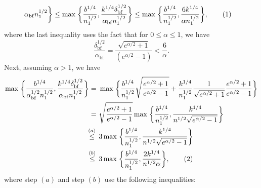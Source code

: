 \documentclass[twoside,11pt]{article}
\newcommand\numberthis{\addtocounter{equation}{1}\tag{\theequation}}
\newcommand{\normSqMultinomMax}{b}
\newcommand{\alphabetSize}{k} %
\newcommand{\sampleSize}{n}
\newcommand{\privacyParameter}{\alpha} %
\newcommand{\privacyParameterrappor}{\privacyParameter_{\mathrm{bf}}}
\newcommand{\smallNumber}{\delta}
\newcommand{\smallNumberrappor}{\smallNumber_{\mathrm{bf}}}
\begin{document}
\begin{appendix}
\begin{itemize}
\begin{align*}
{		}{
			\privacyParameterrappor
			\sampleSize_1^{1/2}}
		\biggr\}
		&\leq
		\max \;
		\biggl\{
		\frac{
			\normSqMultinomMax^{1/4}
		}{
			\sampleSize_1^{1/2}}
		,
		\frac{
			\alphabetSize^{1/4}
			\smallNumberrappor^{1/2} 
		}{
			\privacyParameterrappor
			\sampleSize_1^{1/2}}
		\biggr\}
		\leq
		\max \;
		\biggl\{
		\frac{
			\normSqMultinomMax^{1/4}
		}{
			\sampleSize_1^{1/2}}
		,
		\frac{
			6\alphabetSize^{1/4}
		}{
			\privacyParameter
			\sampleSize_1^{1/2}}
		\biggr\},
		\numberthis
		\label{rappor_final_high_privacy}
	\end{align*}
	where the last inequality uses the fact that for $0 \leq \privacyParameter \leq 1$, we have
	\begin{equation*}
		\frac{\smallNumberrappor^{1/2}}{
			\privacyParameterrappor}
		= 
		\frac{\sqrt{e^{\alpha/2}+1}}{
			(e^{\alpha/2}-1)}
		<
		\frac{6}{\privacyParameter}.
	\end{equation*}
	Next, assuming $ \privacyParameter > 1$, we have
	\begin{align*}
		\max \;
		\biggl\{
		\frac{
			\normSqMultinomMax^{1/4}
		}{
			\privacyParameterrappor^{1/2}
			\sampleSize_1^{1/2}}
		,
		\frac{
			\alphabetSize^{1/4}
			\smallNumberrappor^{1/2} 
		}{
			\privacyParameterrappor
			\sampleSize_1^{1/2}}
		\biggr\}
		= ~&
		\max \;
		\biggl\{
		\frac{b^{1/4}}{\sampleSize_1^{1/2}}\sqrt{\frac{e^{\alpha/2}+1}{e^{\alpha/2}-1}} + \frac{k^{1/4}}{\sampleSize_1^{1/2}}
		\frac{1}{
			\sqrt{
				e^{\alpha/2 }+1
		} }
		\frac{e^{\alpha/2}+1}{e^{\alpha/2}-1}
		\biggr\}
		\\
		= ~&
		\sqrt{\frac{e^{\alpha/2}+1}{e^{\alpha/2}-1}} 
		\max \;
		\biggl\{
		\frac{b^{1/4}}{\sampleSize_1^{1/2}},
		\frac{k^{1/4}}{
			n^{1/2}
			\sqrt{
				e^{\alpha/2 }-1
			}
		}
		\biggr\}
		\\
		\stackrel{(a)}{\leq} \hskip 1.57mm &
		3
		\max \;
		\biggl\{
		\frac{b^{1/4}}{\sampleSize_1^{1/2}},
		\frac{k^{1/4}}{
			n^{1/2}
			\sqrt{
				e^{\alpha/2 }-1
			}
		}
		\biggr\}
		\\
		\stackrel{(b)}{\leq} \hskip 1.57mm &
		3
		\max \;
		\biggl\{
		\frac{b^{1/4}}{\sampleSize_1^{1/2}},
		\frac{2k^{1/4}}{
			n^{1/2}
			\privacyParameter
		}
		\biggr\},
		\numberthis
		\label{rappor_final_low_privacy}
	\end{align*}
	where step $(a)$ and step $(b)$ use the following inequalities:

\end{itemize}
\end{appendix}
\end{document}
